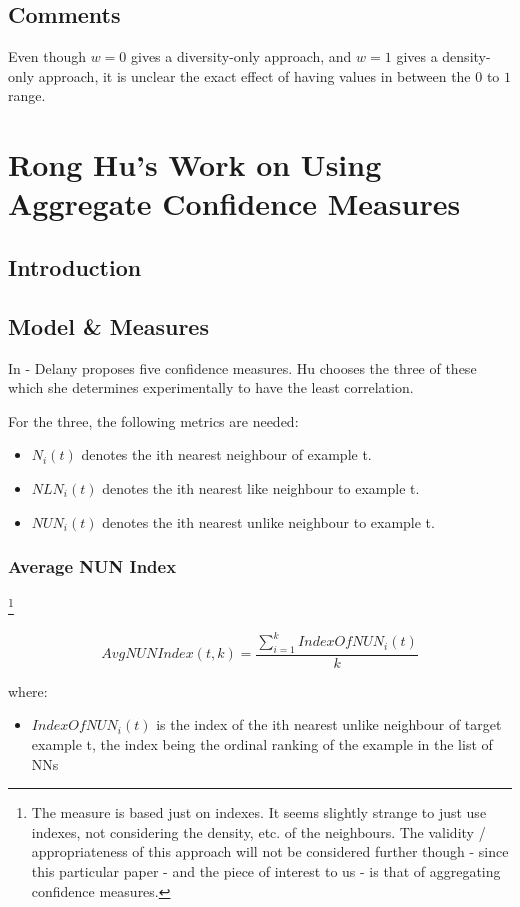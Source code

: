 \documentclass[a4paper,11pt]{report}
\begin{document}
\subsection{Comments}
Even though $w=0$ gives a diversity-only approach, and $w=1$ gives a density-only approach, it is unclear the exact effect of having values in between the $0$ to $1$ range.

\section{Rong Hu's Work on Using Aggregate Confidence Measures}
\subsection{Introduction}

\subsection{Model \& Measures}

In \citet{Delany2005} - Delany proposes five confidence measures. Hu chooses the three of these which she determines experimentally to have the least correlation.

For the three, the following metrics are needed:
\begin{itemize} 
	\item $N_{i}(t)$ denotes the ith nearest neighbour of example t.
	\item $NLN_{i}(t)$ denotes the ith nearest like neighbour to example t.
	\item $NUN_{i}(t)$ denotes the ith nearest unlike neighbour to example t.
\end{itemize}
\subsubsection{Average NUN Index} \footnote{The measure is based just on indexes. It seems slightly strange to just use indexes, not considering the density, etc. of the neighbours. The validity / appropriateness of this approach will not be considered further though - since this particular paper - and the piece of interest to us - is that of aggregating confidence measures.}

\[
AvgNUNIndex(t,k)=\frac{\sum_{i=1}^{k}IndexOfNUN_{i}(t)}{k}
\]

where:
\begin{itemize}
	\item $IndexOfNUN_{i}(t)$ is the index of the ith nearest unlike neighbour of target example t, the index being the ordinal ranking of the example in the list of NNs
\end{itemize}
\end{document}
